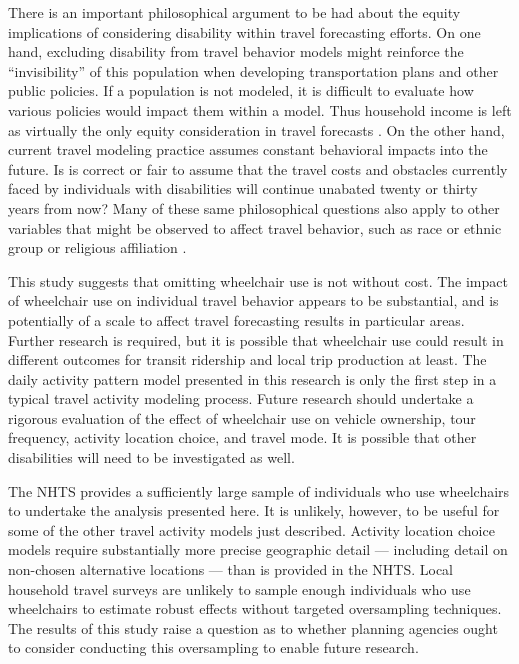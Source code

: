 \documentclass[3p, authoryear, review]{elsarticle} %
\begin{document}
There is an important philosophical argument to be had about the equity
implications of considering disability within travel forecasting efforts. On
one hand, excluding disability from travel behavior models might reinforce the
``invisibility'' of this population when developing transportation plans and other
public policies. If a population is not modeled, it is difficult to evaluate how
various policies would impact them within a model. Thus household income is left
as virtually the only equity consideration in travel forecasts \citep{bills2012}.
On the other hand, current
travel modeling practice assumes constant behavioral impacts into the future. Is
is correct or fair to assume that the travel costs and obstacles currently
faced by individuals with disabilities will continue unabated twenty or thirty
years from now? Many of these same philosophical questions also apply to
other variables that might be observed to affect travel behavior, such as race
or ethnic group or religious affiliation \citep[e.g.,][]{vyas2015}.

This study suggests that omitting wheelchair use is not without cost.
The impact of wheelchair use on individual travel behavior appears to be
substantial, and is potentially of a scale to affect travel forecasting results
in particular areas. Further research is required, but it is possible that wheelchair
use could result in different outcomes for transit ridership and local trip
production at least. The daily activity pattern model presented in this research
is only the first step in a typical travel activity modeling process. Future
research should undertake a rigorous evaluation of the effect of wheelchair use
on vehicle ownership, tour frequency, activity location choice, and travel mode.
It is possible that other disabilities will need to be investigated as well.

The NHTS provides a sufficiently large sample of individuals who use wheelchairs
to undertake the analysis presented here. It is unlikely, however, to be useful
for some of the other travel activity models just described. Activity location
choice models require substantially more precise geographic detail --- including
detail on non-chosen alternative locations --- than is provided in the NHTS.
Local household travel surveys are unlikely to sample enough individuals who use
wheelchairs to estimate robust effects without targeted oversampling techniques.
The results of this study raise a question as to whether planning agencies
ought to consider conducting this oversampling to enable future research.
\end{document}
